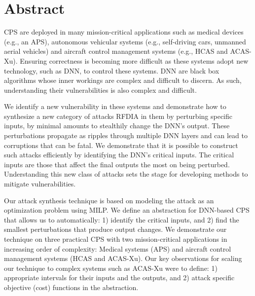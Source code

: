 
\chapter{Abstract}

\ac{CPS} are deployed in many mission-critical applications such as medical devices (e.g., an \ac{APS}), autonomous vehicular systems (e.g., self-driving cars, unmanned aerial vehicles) and aircraft control management systems (e.g.,  \ac{HCAS} and \ac{ACAS-Xu}). 
Ensuring correctness is becoming more difficult as these systems adopt new technology, such as \ac{DNN}, to control these systems. 
\ac{DNN} are black box algorithms whose inner workings are complex and difficult to discern.
As such, understanding their vulnerabilities is also complex and difficult. 

We identify a new vulnerability in these systems and demonstrate how to synthesize a new category of attacks \ac{RFDIA} in them by perturbing specific inputs, by minimal amounts to stealthily change the \ac{DNN}'s output. 
 These  perturbations propagate as ripples through multiple \ac{DNN} layers and can lead to corruptions that can be fatal. 
We demonstrate that it is possible  to construct such attacks efficiently by identifying the \ac{DNN}'s critical inputs. 
The critical inputs are those that  affect the final outputs the most on being perturbed. 
Understanding this new class of attacks sets the stage for developing methods to mitigate vulnerabilities. 

Our attack synthesis technique is based on modeling the attack as an optimization problem using \ac{MILP}.
We define an abstraction for \ac{DNN}-based \ac{CPS} that allows us to automatically: 1) identify the critical inputs, and 2) find the smallest perturbations that produce output changes. 
We demonstrate our technique on three practical \ac{CPS} with two mission-critical applications in increasing order of complexity: Medical systems (\ac{APS}) and aircraft control management systems (\ac{HCAS} and \ac{ACAS-Xu}). 
Our key observations for scaling our technique to complex systems such as \ac{ACAS-Xu} were to define: 1) appropriate intervals for their inputs and the outputs, and 2) attack specific objective (cost) functions in the abstraction.  
 



